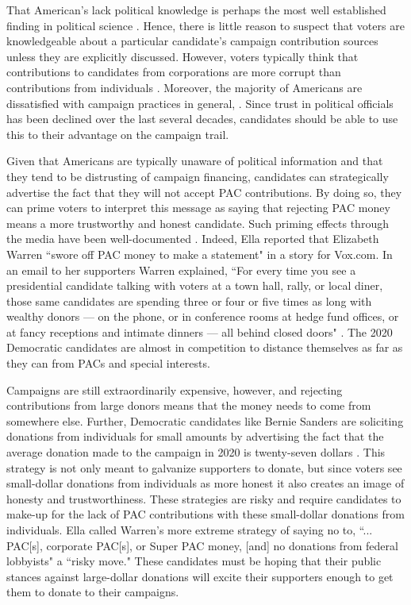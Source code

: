 \documentclass[12pt]{article}
\begin{document}
 That American's lack political knowledge is perhaps the most well established finding in political science \citep{page_rational_1992, carpini_what_1997}. Hence, there is little reason to suspect that voters are knowledgeable about a particular candidate's campaign contribution sources unless they are explicitly discussed. However, voters typically think that contributions to candidates from corporations are more corrupt than contributions from individuals \citep{bowler_campaign_2016}. Moreover, the majority of Americans are dissatisfied with campaign practices in general, \citep{mayer_public_2001, persily_perceptions_2004}. Since trust in political officials has been declined over the last several decades, candidates should be able to use this to their advantage on the campaign trail.
 
 Given that Americans are typically unaware of political information and that they tend to be distrusting of campaign financing, candidates can strategically advertise the fact that they will not accept PAC contributions. By doing so, they can prime voters to interpret this message as saying that rejecting PAC money means a more trustworthy and honest candidate. Such priming effects through the media have been well-documented \citep{iyengar_news_1989}. Indeed, Ella \citet{nilsen_race_2019} reported that Elizabeth Warren ``swore off PAC money to make a statement" in a story for Vox.com. In an email to her supporters Warren explained, ``For every time you see a presidential candidate talking with voters at a town hall, rally, or local diner, those same candidates are spending three or four or five times as long with wealthy donors — on the phone, or in conference rooms at hedge fund offices, or at fancy receptions and intimate dinners — all behind closed doors" \citep{nilsen_race_2019}. The 2020 Democratic candidates are almost in competition to distance themselves as far as they can from PACs and special interests. 
 
 Campaigns are still extraordinarily expensive, however, and rejecting contributions from large donors means that the money needs to come from somewhere else. Further, Democratic candidates like Bernie Sanders are soliciting donations from individuals for small amounts by advertising the fact that the average donation made to the campaign in 2020 is twenty-seven dollars \citep{gambino_not_2019}. This strategy is not only meant to galvanize supporters to donate, but since voters see small-dollar donations from individuals as more honest \citep{bowler_campaign_2016} it also creates an image of honesty and trustworthiness. These strategies are risky and require candidates to make-up for the lack of PAC contributions with these small-dollar donations from individuals. Ella \citet{nilsen_race_2019} called Warren's more extreme strategy of saying no to, ``... PAC[s], corporate PAC[s], or Super PAC money, [and] no donations from federal lobbyists" a ``risky move." These candidates must be hoping that their public stances against large-dollar donations will excite their supporters enough to get them to donate to their campaigns.
\end{document}
